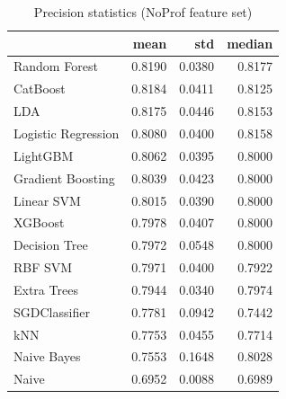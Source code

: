 \begin{table}
\caption{Precision statistics (NoProf feature set)}
\label{tab:precision_NoProf_stats}
\begin{tabular}{lrrr}
\toprule
 & mean & std & median \\
\midrule
Random Forest & 0.8190 & 0.0380 & 0.8177 \\
CatBoost & 0.8184 & 0.0411 & 0.8125 \\
LDA & 0.8175 & 0.0446 & 0.8153 \\
Logistic Regression & 0.8080 & 0.0400 & 0.8158 \\
LightGBM & 0.8062 & 0.0395 & 0.8000 \\
Gradient Boosting & 0.8039 & 0.0423 & 0.8000 \\
Linear SVM & 0.8015 & 0.0390 & 0.8000 \\
XGBoost & 0.7978 & 0.0407 & 0.8000 \\
Decision Tree & 0.7972 & 0.0548 & 0.8000 \\
RBF SVM & 0.7971 & 0.0400 & 0.7922 \\
Extra Trees & 0.7944 & 0.0340 & 0.7974 \\
SGDClassifier & 0.7781 & 0.0942 & 0.7442 \\
kNN & 0.7753 & 0.0455 & 0.7714 \\
Naive Bayes & 0.7553 & 0.1648 & 0.8028 \\
Naive & 0.6952 & 0.0088 & 0.6989 \\
\bottomrule
\end{tabular}
\end{table}
